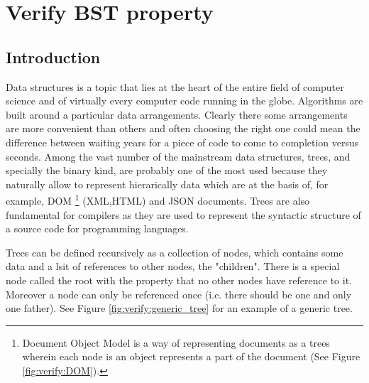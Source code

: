 %

\chapter{Verify BST property}
\label{ch:verify_BST}
\section*{Introduction}
Data structures is a topic that lies at the heart of the entire field of computer science and of virtually every computer code running in the globe.
Algorithms are built around a particular data arrangements. Clearly there some arrangements are more convenient than others and often choosing the right one could mean the difference between waiting years for a piece of code to come to completion versus seconds. 
Among the vast number of the mainstream data structures, trees, and specially the binary kind, are probably one of the most used because they naturally allow to represent hierarically data which are at the basis of, for example, DOM \footnote{Document Object Model is a way of representing documents as a trees wherein each node is an object represents a part of the document (See Figure \ref{fig:verify:DOM}).} (XML,HTML) and  JSON documents.
Trees are also fundamental for compilers as they are used to represent the syntactic structure of a source code for programming languages.

Trees can be defined recursively as a collection of nodes, which contains some data and a lsit of references to other nodes, the "children". There is a special node called the root with the property that no other nodes have reference to it. Moreover a node can only be referenced once (i.e. there should be one and only one father). See Figure \ref{fig:verify:generic_tree} for an example of a generic tree.




